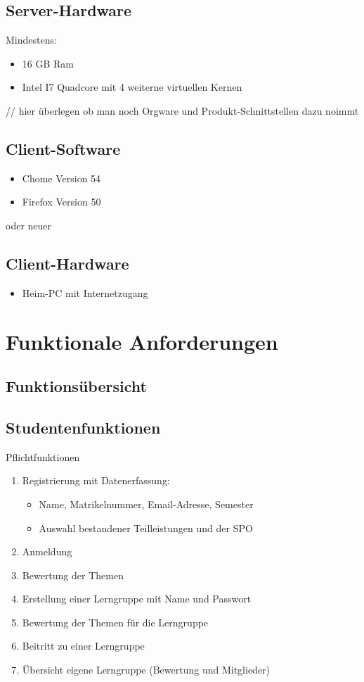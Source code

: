 \documentclass[parskip=full]{scrartcl}
\newcommand{\swtLabel}[1]{\textbf{\textbackslash #1\arabic*0\textbackslash}}
\begin{document}
\subsection{Server-Hardware}
Mindestens:
\begin{itemize} 
  \item 16 GB Ram
  \item Intel I7 Quadcore mit 4 weiterne virtuellen Kernen 
\end{itemize}
// hier überlegen ob man noch Orgware und Produkt-Schnittstellen dazu noimmt

\subsection{Client-Software}
\begin{itemize}
  \item Chome Version 54
  \item Firefox Version 50
\end{itemize}
oder neuer
\subsection{Client-Hardware}
\begin{itemize}
  \item Heim-PC mit Internetzugang
\end{itemize}
\section{Funktionale Anforderungen}

\subsection{Funktionsübersicht}

\subsection{Studentenfunktionen}

Pflichtfunktionen

\begin{enumerate}[label=\swtLabel{FA}]
  \item Registrierung mit Datenerfassung:
  \begin{itemize}
    \item Name, Matrikelnummer, Email-Adresse, Semester
    \item Auswahl bestandener Teilleistungen und der SPO
  \end{itemize}
  \item Anmeldung
  \item Bewertung der Themen
  \item Erstellung einer Lerngruppe mit Name und Passwort
  \item Bewertung der Themen für die Lerngruppe
  \item Beitritt zu einer Lerngruppe
  \item Übersicht eigene Lerngruppe (Bewertung und Mitglieder)
\end{enumerate}
\end{document}

